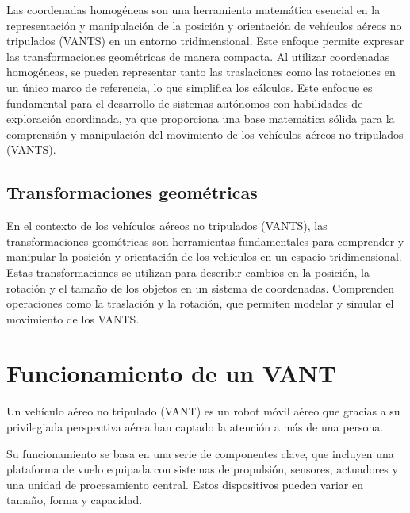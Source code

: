 Las coordenadas homogéneas son una herramienta matemática esencial en la representación y manipulación de la posición y orientación de vehículos aéreos no tripulados (VANTS) en un entorno tridimensional. Este enfoque permite expresar las transformaciones geométricas de manera compacta. Al utilizar coordenadas homogéneas, se pueden representar tanto las traslaciones como las rotaciones en un único marco de referencia, lo que simplifica los cálculos. Este enfoque es fundamental para el desarrollo de sistemas autónomos con habilidades de exploración coordinada, ya que proporciona una base matemática sólida para la comprensión y manipulación del movimiento de los vehículos aéreos no tripulados (VANTS).


\subsection*{Transformaciones geométricas}

En el contexto de los vehículos aéreos no tripulados (VANTS), las transformaciones geométricas son herramientas fundamentales para comprender y manipular la posición y orientación de los vehículos en un espacio tridimensional. Estas transformaciones se utilizan para describir cambios en la posición, la rotación y el tamaño de los objetos en un sistema de coordenadas. Comprenden operaciones como la traslación y la rotación, que permiten modelar y simular el movimiento de los VANTS. 


\section{Funcionamiento de un VANT}

Un vehículo aéreo no tripulado (VANT) es un robot móvil aéreo que gracias a su privilegiada perspectiva aérea han captado la atención a más de una persona.

Su funcionamiento se basa en una serie de componentes clave, que incluyen una plataforma de vuelo equipada con sistemas de propulsión, sensores, actuadores y una unidad de procesamiento central. Estos dispositivos pueden variar en tamaño, forma y capacidad.



